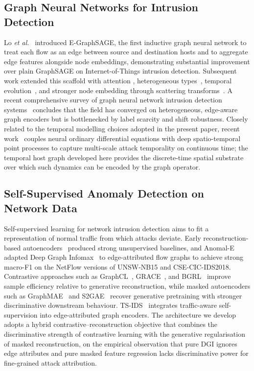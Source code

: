\documentclass[journal,twoside]{IEEEtran}
\begin{document}
\subsection{Graph Neural Networks for Intrusion Detection}
Lo \emph{et al.}~\cite{lo2022egraphsage} introduced E-GraphSAGE, the first
inductive graph neural network to treat each flow as an edge between source
and destination hosts and to aggregate edge features alongside node
embeddings, demonstrating substantial improvement over plain GraphSAGE
\cite{hamilton2017graphsage} on Internet-of-Things intrusion detection.
Subsequent work extended this scaffold with attention
\cite{caville2022anomale}, heterogeneous types~\cite{hu2020hgt}, temporal
evolution~\cite{rossi2020tgn}, and stronger node embedding through scattering
transforms~\cite{bilot2023survey}. A recent comprehensive survey of graph
neural network intrusion detection systems~\cite{bilot2023survey}
concludes that the field has converged on heterogeneous, edge-aware graph
encoders but is bottlenecked by label scarcity and shift robustness.
Closely related to the temporal modelling choices adopted in the present
paper, recent work~\cite{anaedevha2026neuralode} couples neural ordinary
differential equations with deep spatio-temporal point processes to capture
multi-scale attack temporality on continuous time; the temporal host graph
developed here provides the discrete-time spatial substrate over which such
dynamics can be encoded by the graph operator.

\subsection{Self-Supervised Anomaly Detection on Network Data}
Self-supervised learning for network intrusion detection aims to fit a
representation of normal traffic from which attacks deviate. Early
reconstruction-based autoencoders~\cite{mirsky2018kitsune} produced strong
unsupervised baselines, and Anomal-E~\cite{caville2022anomale} adapted Deep
Graph Infomax~\cite{velickovic2019dgi} to edge-attributed flow graphs to
achieve strong macro-F1 on the NetFlow versions of UNSW-NB15 and
CSE-CIC-IDS2018. Contrastive
approaches such as GraphCL~\cite{you2020graphcl}, GRACE~\cite{zhu2020grace},
and BGRL~\cite{thakoor2022bgrl} improve sample efficiency relative to
generative reconstruction, while masked autoencoders such as
GraphMAE~\cite{hou2022graphmae} and S2GAE~\cite{tan2023s2gae} recover
generative pretraining with stronger discriminative downstream behaviour.
TS-IDS~\cite{nguyen2023tsids} integrates traffic-aware self-supervision into
edge-attributed graph encoders. The architecture we develop adopts a
hybrid contrastive--reconstruction objective that combines the discriminative
strength of contrastive learning with the generative regularisation of
masked reconstruction, on the empirical observation that pure DGI ignores
edge attributes and pure masked feature regression lacks discriminative
power for fine-grained attack attribution.
\end{document}
